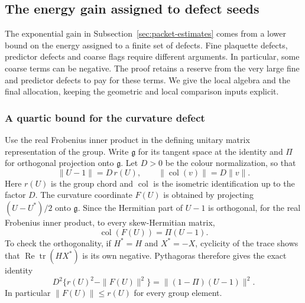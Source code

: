 \subsection{The energy gain assigned to defect seeds}
\label{sec:seed-energy}
The exponential gain in Subsection~\ref{sec:packet-estimates} comes from
a lower bound on the energy assigned to a finite set of defects. Fine
plaquette defects, predictor defects and coarse flags require different
arguments. In particular, some coarse terms can be negative. The proof
retains a reserve from the very large fine and predictor defects to pay
for these terms. We give the local algebra and the final allocation,
keeping the geometric and local comparison inputs explicit.

\subsubsection{A quartic bound for the curvature defect}
Use the real Frobenius inner product in the defining unitary matrix
representation of the group. Write $\mathfrak g$ for its tangent space
at the identity and $\Pi$ for orthogonal projection onto $\mathfrak g$.
Let $D>0$ be the colour normalization, so that
\[
 \|U-1\|=D\,r(U),\qquad
 \|\operatorname{col}(v)\|=D\|v\|.
\]
Here $r(U)$ is the group chord and $\operatorname{col}$ is the
isometric identification up to the factor $D$. The curvature coordinate
$F(U)$ is obtained by projecting $(U-U^*)/2$ onto $\mathfrak g$.
Since the Hermitian part of $U-1$ is orthogonal, for the real Frobenius
inner product, to every skew-Hermitian matrix,
\[
 \operatorname{col}(F(U))=\Pi(U-1).
\]
To check the orthogonality, if $H^*=H$ and $X^*=-X$, cyclicity of the
trace shows that $\operatorname{Re}\operatorname{tr}(HX^*)$ is its own
negative. Pythagoras therefore gives the exact identity
\begin{equation}\label{eq:seed-normal-defect}
 D^2\{r(U)^2-\|F(U)\|^2\}
       =\|(1-\Pi)(U-1)\|^2.
\end{equation}
In particular $\|F(U)\|\le r(U)$ for every group element.

